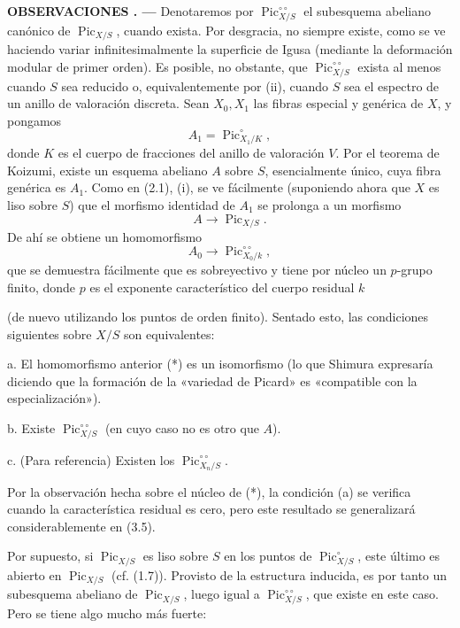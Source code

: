 \documentclass[11pt,twoside,openany]{book}
\numberwithin{equation}{section}
\newcommand{\src}[1]{%
  \phantomsection\hypertarget{src:#1}{}%
  \marginpar{\raggedleft\footnotesize\sffamily #1}%
}
\theoremstyle{plain}
\theoremstyle{definition}
\theoremstyle{remark}
\newcommand{\result}[2]{%
  \par\medskip\noindent\textbf{#1%
  \if\relax\detokenize{#2}\relax\else\space#2\fi. ---}\enspace
}
\newcommand{\FgaUnitKey}{frontmatter}
\renewcommand{\src}[1]{%
  \phantomsection\hypertarget{src:\FgaUnitKey:#1}{}%
  \marginpar{\raggedleft\footnotesize\sffamily #1}%
}
\theoremstyle{plain}
\theoremstyle{definition}
\theoremstyle{remark}
\begin{document}
\result{OBSERVACIONES}{3.4} Denotaremos por
$\operatorname{Pic}_{X/S}^{\circ\circ}$ el subesquema abeliano canónico de
$\operatorname{Pic}_{X/S}$, cuando exista. Por desgracia, no siempre existe,
como se ve haciendo variar infinitesimalmente la superficie de Igusa (mediante
la deformación modular de primer orden). Es posible, no obstante, que
$\operatorname{Pic}_{X/S}^{\circ\circ}$ exista al menos cuando $S$ sea reducido
o, equivalentemente por (ii), cuando $S$ sea el espectro de un anillo de
valoración discreta. Sean $X_0,X_1$ las fibras especial y genérica de $X$, y
pongamos
\[
A_1=\operatorname{Pic}_{X_1/K}^\circ,
\]
donde $K$ es el cuerpo de fracciones del anillo de valoración $V$. Por el
teorema de Koizumi, existe un esquema abeliano $A$ sobre $S$, esencialmente
único, cuya fibra genérica es $A_1$. Como en (2.1), (i), se ve fácilmente
(suponiendo ahora que $X$ es liso sobre $S$) que el morfismo identidad de $A_1$
se prolonga a un morfismo
\[
A\longrightarrow\operatorname{Pic}_{X/S}.
\]
De ahí se obtiene un homomorfismo
\[
\tag{*}A_0\longrightarrow\operatorname{Pic}_{X_0/k}^{\circ\circ},
\]
que se demuestra fácilmente que es sobreyectivo y tiene por núcleo un
$p$-grupo finito, donde $p$ es el exponente característico del cuerpo residual
$k$

\src{239}
(de nuevo utilizando los puntos de orden finito). Sentado esto, las condiciones
siguientes sobre $X/S$ son equivalentes:

\medskip
\noindent a. El homomorfismo anterior (*) es un isomorfismo (lo que Shimura
expresaría diciendo que la formación de la «variedad de Picard» es «compatible
con la especialización»).

\noindent b. Existe $\operatorname{Pic}_{X/S}^{\circ\circ}$ (en cuyo caso no es
otro que $A$).

\noindent c. (Para referencia) Existen los
$\operatorname{Pic}_{X_n/S}^{\circ\circ}$.

Por la observación hecha sobre el núcleo de (*), la condición (a) se verifica
cuando la característica residual es cero, pero este resultado se generalizará
considerablemente en (3.5).

Por supuesto, si $\operatorname{Pic}_{X/S}$ es liso sobre $S$ en los puntos de
$\operatorname{Pic}_{X/S}^\circ$, este último es abierto en
$\operatorname{Pic}_{X/S}$ (cf. (1.7)). Provisto de la estructura inducida, es
por tanto un subesquema abeliano de $\operatorname{Pic}_{X/S}$, luego igual a
$\operatorname{Pic}_{X/S}^{\circ\circ}$, que existe en este caso. Pero se tiene
algo mucho más fuerte:
\end{document}
